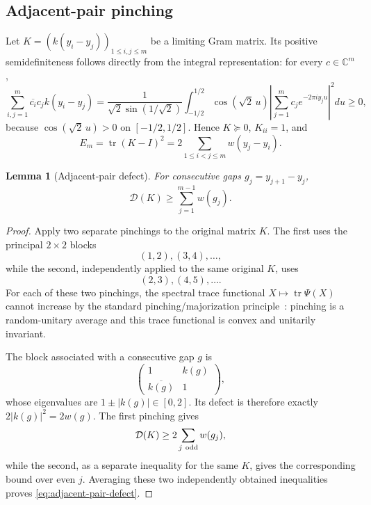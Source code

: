 \documentclass[11pt]{article}
\newtheorem{lemma}[theorem]{Lemma}
\begin{document}
\subsection{Adjacent-pair pinching}

Let \(K=(k(y_i-y_j))_{1\le i,j\le m}\) be a limiting Gram matrix.  Its
positive semidefiniteness follows directly from the integral representation:
for every \(c\in\mathbb C^m\),
\[
 \sum_{i,j=1}^m \overline{c_i}c_j k(y_i-y_j)
 =\frac1{\sqrt2\sin(1/\sqrt2)}\int_{-1/2}^{1/2}\cos(\sqrt2\,u)
   \left|\sum_{j=1}^m c_j e^{-2\pi i y_j u}\right|^2du\ge0,
\]
because \(\cos(\sqrt2\,u)>0\) on \([-1/2,1/2]\).  Hence
\(K\succeq0\), \(K_{ii}=1\), and
\begin{equation}\label{eq:Em-trace}
 E_m
 =
 \operatorname{tr}(K-I)^2
 =
 2\sum_{1\le i<j\le m}w(y_j-y_i).
\end{equation}

\begin{lemma}[Adjacent-pair defect]\label{lem:adjacent-pairs}
For consecutive gaps \(g_j=y_{j+1}-y_j\),
\begin{equation}\label{eq:adjacent-pair-defect}
 \boxed{\mathcal D(K)\ge\sum_{j=1}^{m-1}w(g_j)}.
\end{equation}
\end{lemma}

\begin{proof}
Apply two separate pinchings to the original matrix \(K\).  The first uses the
principal \(2\times2\) blocks
\[
 (1,2),(3,4),\ldots,
\]
while the second, independently applied to the same original \(K\), uses
\[
 (2,3),(4,5),\ldots .
\]
For each of these two pinchings, the spectral trace functional
\(X\mapsto\operatorname{tr}\Psi(X)\) cannot increase by the standard
pinching/majorization principle~\cite{Bhatia97}: pinching is a random-unitary
average and this trace functional is convex and unitarily invariant.

The block associated with a consecutive gap \(g\) is
\[
 \begin{pmatrix}1&k(g)\\ \overline{k(g)}&1\end{pmatrix},
\]
whose eigenvalues are \(1\pm|k(g)|\in[0,2]\).  Its defect is therefore
exactly \(2|k(g)|^2=2w(g)\).  The first pinching gives
\[
 \mathcal D(K)\ge2\sum_{j\ {\rm odd}}w(g_j),
\]
while the second, as a separate inequality for the same \(K\), gives the
corresponding bound over even \(j\).  Averaging these two independently
obtained inequalities proves \eqref{eq:adjacent-pair-defect}.
\end{proof}
\end{document}

